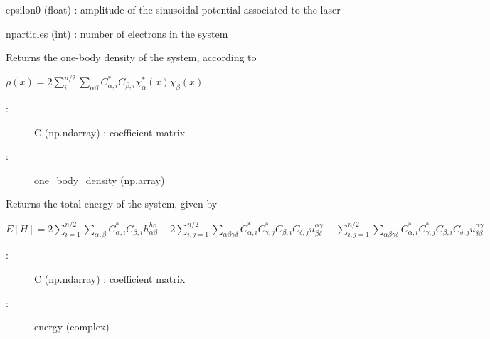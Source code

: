 \documentclass[letterpaper,10pt,english]{sphinxmanual}
\begin{document}
\begin{fulllineitems}
\begin{description}
epsilon0 (float) : amplitude of the sinusoidal potential associated to the laser

nparticles (int) : number of electrons in the system

\end{description}

\begin{fulllineitems}
\label{\detokenize{index:do.RHF.eval_one_body_density}}
Returns the one-body density of the system, according to

\(\rho(x) = 2 \sum_i^{n/2} \sum_{\alpha\beta} C_{\alpha,i}^* C_{\beta,i} \chi_{\alpha}^*(x) \chi_{\beta}(x)\)
\begin{description}
\item[{:}] \leavevmode
C (np.ndarray) : coefficient matrix

\item[{:}] \leavevmode
one\_body\_density (np.array)

\end{description}

\end{fulllineitems}


\begin{fulllineitems}
\label{\detokenize{index:do.RHF.eval_total_energy}}
Returns the total energy of the system, given by

\(E[H] = 2\sum_{i=1}^{n/2} \sum_{\alpha,\beta} C_{\alpha,i}^* C_{\beta,i} h_{\alpha\beta}^{ho} + 2 \sum_{i,j=1}^{n/2} \sum_{\alpha\beta\gamma\delta} C_{\alpha,i}^* C_{\gamma,j}^* C_{\beta,i} C_{\delta,j}  u^{\alpha\gamma}_{\beta\delta} - \sum_{i,j=1}^{n/2} \sum_{\alpha\beta\gamma\delta} C_{\alpha,i}^* C_{\gamma,j}^* C_{\beta,i} C_{\delta,j}  u^{\alpha\gamma}_{\delta\beta}\)
\begin{description}
\item[{:}] \leavevmode
C (np.ndarray) : coefficient matrix

\item[{:}] \leavevmode
energy (complex)


\end{description}
\end{fulllineitems}
\end{fulllineitems}
\end{document}
